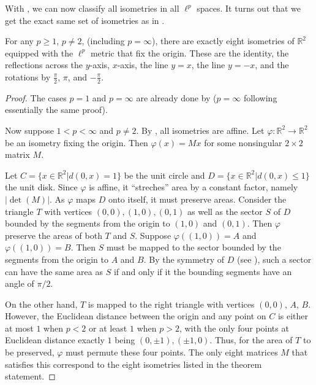 \documentclass{mystyle}
\begin{document}
With , we can now classify all isometries in all $\ell^p$ spaces. It turns out that we get the exact same set of isometries as in . 
\begin{theorem}\label{thm_main}
    For any $p \geq 1$, $p \neq 2$, (including $p = \infty$), there are exactly eight isometries of $\mathbb{R}^2$ equipped with the $\ell^p$ metric that fix the origin. These are the identity, the reflections across the $y$-axis, $x$-axis, the line $y=x$, the line $y=-x$, and the rotations by $\frac{\pi}{2}$, $\pi$, and $-\frac{\pi}{2}$.
\end{theorem}
\begin{proof}
    The cases $p = 1$ and $p = \infty$ are already done by  ($p = \infty$ following essentially the same proof). 
    
    Now suppose $1 < p < \infty$ and $p \neq 2$. By , all isometries are affine. Let $\varphi: \mathbb{R}^2 \to \mathbb{R}^2$ be an isometry fixing the origin. Then $\varphi(x) = Mx$ for some nonsingular $2 \times 2$ matrix $M$. 

    Let $C = \{x \in \mathbb{R}^2| d(0, x) = 1\}$ be the unit circle and $D = \{x \in \mathbb{R}^2| d(0, x) \leq 1\}$ the unit disk. Since $\varphi$ is affine, it ``streches'' area by a constant factor, namely $|\det (M)|$. As $\varphi$ maps $D$ onto itself, it must preserve areas. Consider the triangle $T$ with vertices $(0, 0), (1, 0), (0, 1)$ as well as the sector $S$ of $D$ bounded by the segments from the origin to $(1, 0)$ and $(0, 1)$. Then $\varphi$ preserve the areas of both $T$ and $S$. Suppose $\varphi((1, 0)) = A$ and $\varphi((1, 0)) = B$. Then $S$ must be mapped to the sector bounded by the segments from the origin to $A$ and $B$. By the symmetry of $D$ (see ), such a sector can have the same area as $S$ if and only if it the bounding segments have an angle of $\pi/2$. 

    On the other hand, $T$ is mapped to the right triangle with vertices $(0, 0)$, $A$, $B$. However, the Euclidean distance between the origin and any point on $C$ is either at most $1$ when $p < 2$ or at least $1$ when $p > 2$, with the only four points at Euclidean distance exactly $1$ being $(0, \pm 1), (\pm 1, 0)$. Thus, for the area of $T$ to be preserved, $\varphi$ must permute these four points. The only eight matrices $M$ that satisfies this correspond to the eight isometries listed in the theorem statement. 
\end{proof}
\end{document}
